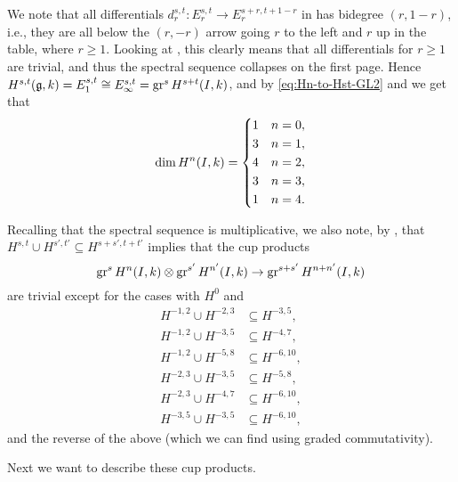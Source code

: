 We note that all differentials $d_{r}^{s,t} \colon E_{r}^{s,t} \to E_{r}^{s+r,t+1-r}$ in  has bidegree $(r,1-r)$, i.e., they are all below the $(r,-r)$ arrow going $r$ to the left and $r$ up in the table, where $r \geq 1$. Looking at , this clearly means that all differentials for $r \geq 1$ are trivial, and thus the spectral sequence collapses on the first page. Hence $H^{s,t}(\mathfrak{g},k) = E_{1}^{s,t} \cong E_{\infty}^{s,t} = \operatorname{gr}^{s} H^{s+t}(I,k)$, and by \eqref{eq:Hn-to-Hst-GL2} and  we get that
\begin{equation}
  \label{eq:dim-HnI-GL2}
  \dim H^{n}(I,k) =
  \begin{dcases}
    1 & n=0, \\
    3 & n=1, \\
    4 & n=2, \\
    3 & n=3, \\
    1 & n=4.
  \end{dcases}
\end{equation}

Recalling that the spectral sequence is multiplicative, we also note, by , that $H^{s,t} \cup H^{s',t'} \subseteq H^{s+s',t+t'}$ implies that the cup products
\begin{equation*}
  \operatorname{gr}^{s} H^{n}(I,k) \otimes \operatorname{gr}^{s'} H^{n'}(I,k) \to \operatorname{gr}^{s+s'} H^{n+n'}(I,k)
\end{equation*}
are trivial except for the cases with $H^{0}$ and
\begin{equation}\label{eq:non-triv-cups-GL2}
  \begin{aligned}
    H^{-1,2} \cup H^{-2,3} &\subseteq H^{-3,5}, \\
    H^{-1,2} \cup H^{-3,5} &\subseteq H^{-4,7}, \\
    H^{-1,2} \cup H^{-5,8} &\subseteq H^{-6,10}, \\
    H^{-2,3} \cup H^{-3,5} &\subseteq H^{-5,8}, \\
    H^{-2,3} \cup H^{-4,7} &\subseteq H^{-6,10}, \\
    H^{-3,5} \cup H^{-3,5} &\subseteq H^{-6,10},
  \end{aligned}
\end{equation}
and the reverse of the above (which we can find using graded commutativity).

Next we want to describe these cup products.

